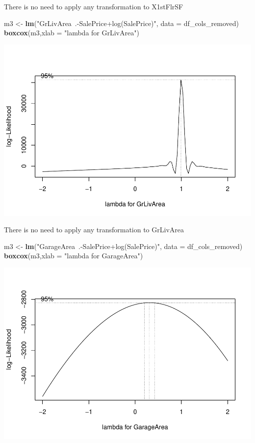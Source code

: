 \documentclass[
]{article}
\newenvironment{Shaded}{\begin{snugshade}}{\end{snugshade}}
\newcommand{\DataTypeTok}[1]{\textcolor[rgb]{0.13,0.29,0.53}{#1}}
\newcommand{\KeywordTok}[1]{\textcolor[rgb]{0.13,0.29,0.53}{\textbf{#1}}}
\newcommand{\NormalTok}[1]{#1}
\newcommand{\StringTok}[1]{\textcolor[rgb]{0.31,0.60,0.02}{#1}}
\begin{document}
There is no need to apply any transformation to X1stFlrSF

\begin{Shaded}
\begin{Highlighting}[]
\NormalTok{m3 <-}\StringTok{ }\KeywordTok{lm}\NormalTok{(}\StringTok{"GrLivArea~.-SalePrice+log(SalePrice)"}\NormalTok{, }\DataTypeTok{data =}\NormalTok{ df_cols_removed)}
\KeywordTok{boxcox}\NormalTok{(m3,}\DataTypeTok{xlab =} \StringTok{"lambda for GrLivArea"}\NormalTok{)}
\end{Highlighting}
\end{Shaded}

\includegraphics{Project_files/figure-latex/unnamed-chunk-17-1.pdf}

There is no need to apply any transformation to GrLivArea

\begin{Shaded}
\begin{Highlighting}[]
\NormalTok{m3 <-}\StringTok{ }\KeywordTok{lm}\NormalTok{(}\StringTok{"GarageArea~.-SalePrice+log(SalePrice)"}\NormalTok{, }\DataTypeTok{data =}\NormalTok{ df_cols_removed)}
\KeywordTok{boxcox}\NormalTok{(m3,}\DataTypeTok{xlab =} \StringTok{"lambda for GarageArea"}\NormalTok{)}
\end{Highlighting}
\end{Shaded}

\includegraphics{Project_files/figure-latex/unnamed-chunk-18-1.pdf}
\end{document}
